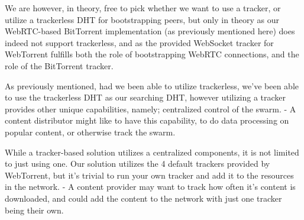 We are however, in theory, free to pick whether we want to use a tracker, or 
utilize a trackerless \acs{DHT} for bootstrapping peers, but only in theory as our
WebRTC-based BitTorrent implementation (as previously mentioned here) does
indeed not support trackerless, and as the provided WebSocket tracker for 
WebTorrent fulfills both the role of bootstrapping WebRTC connections, and the
role of the BitTorrent tracker.

As previously mentioned, had we been able to utilize trackerless, we've been
able to use the trackerless \acs{DHT} as our searching \acs{DHT}, however utilizing a
tracker provides other unique capabilities, namely; centralized control of the
swarm. 
\newline
- A content distributor might like to have this capability, to do data
processing on popular content, or otherwise track the swarm.

While a tracker-based solution utilizes a centralized components, it is not
limited to just using one. Our solution utilizes the 4 default trackers
provided by WebTorrent, but it's trivial to run your own tracker and add it to
the resources in the network.
\newline
- A content provider may want to track how often it's content is downloaded,
and could add the content to the network with just one tracker being their own.


